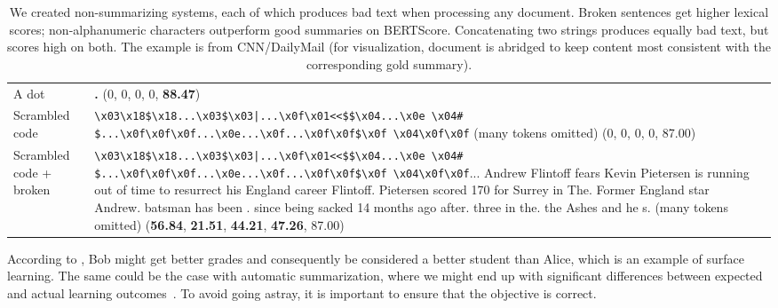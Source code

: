 \documentclass[11pt]{article}
\theoremstyle{remark}
\begin{document}
\begin{table*}[!t]
\begin{tabularx}{\textwidth}{p{}Xp{}}
   \\
\cellcolor{mygray}
A dot&
\cellcolor{mygray}
  \textbf{\color{mymagenta}.} \hfill(0, 0, 0, 0, \textbf{88.47}) &
   \\
Scrambled code&
\texttt{\color{mymagenta}\textbackslash{}x03\textbackslash{}x18\$\textbackslash{}x18...\textbackslash{}x03\$\textbackslash{}x03|...\textbackslash{}x0f\textbackslash{}x01\textless{}\textless{}\$\$\textbackslash{}x04...\textbackslash{}x0e \textbackslash{}x04\# \$...\textbackslash{}x0f\textbackslash{}x0f\textbackslash{}x0f...\textbackslash{}x0e...\textbackslash{}x0f...\textbackslash{}x0f\textbackslash{}x0f\$\textbackslash{}x0f \textbackslash{}x04\textbackslash{}x0f\textbackslash{}x0f} (many tokens omitted) \hfill(0, 0, 0, 0, 87.00) &
   \\
\cellcolor{mygray}
Scrambled code + broken&
\cellcolor{mygray}
  \texttt{\color{mymagenta}\textbackslash{}x03\textbackslash{}x18\$\textbackslash{}x18...\textbackslash{}x03\$\textbackslash{}x03|...\textbackslash{}x0f\textbackslash{}x01\textless{}\textless{}\$\$\textbackslash{}x04...\textbackslash{}x0e \textbackslash{}x04\# \$...\textbackslash{}x0f\textbackslash{}x0f\textbackslash{}x0f...\textbackslash{}x0e...\textbackslash{}x0f...\textbackslash{}x0f\textbackslash{}x0f\$\textbackslash{}x0f \textbackslash{}x04\textbackslash{}x0f\textbackslash{}x0f}...    \textcolor{mypurple}{Andrew Flintoff fears Kevin Pietersen is running out of time to   resurrect his England career Flintoff.    Pietersen scored 170 for Surrey in The.  Former England star Andrew.  batsman has been .  since being sacked 14 months ago   after.  three in the.  the Ashes and he s.} (many tokens omitted)\hspace{100pt} \hfill(\textbf{56.84}, \textbf{21.51}, \textbf{44.21}, \textbf{47.26}, 87.00) &\\
\hline
  
\end{tabularx}

\caption{We created non-summarizing systems, each of which produces bad text when processing any document. Broken sentences get higher lexical scores; non-alphanumeric characters outperform good summaries on BERTScore. Concatenating two strings produces equally bad text, but scores high on both. The example is from CNN/DailyMail (for
visualization, document is abridged to keep content most consistent with the corresponding gold summary).
}
\label{tab:example}
\end{table*} 
According to \citeauthor{geirhos2020shortcut}, Bob might get better grades and consequently be considered a better student than Alice, which is an example of surface learning. The same could be the case with automatic summarization, where we might end up with significant differences between expected and actual learning outcomes~\cite{paulus2018a}. To avoid going astray, it is important to ensure that the objective is correct.
\end{document}
